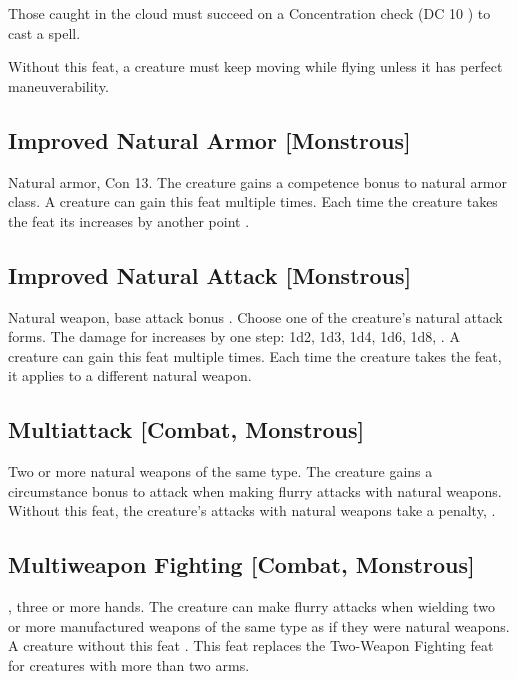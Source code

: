 Those caught in the cloud must succeed on a Concentration check (DC 10 \add {} ) to cast a spell.

 Without this feat, a creature must keep moving while flying unless it has perfect maneuverability.

\subsection{Improved Natural Armor [Monstrous]}
 Natural armor, Con 13.
 The creature gains a  competence bonus to natural armor class.
 A creature can gain this feat multiple times. Each time the creature takes the feat its  increases by another point .

\subsection{Improved Natural Attack [Monstrous]}
 Natural weapon, base attack bonus .
 Choose one of the creature's natural attack forms. The damage for  increases by one step: 1d2, 1d3, 1d4, 1d6, 1d8, .
 A creature can gain this feat multiple times. Each time the creature takes the feat, it applies to a different natural weapon.

\subsection{Multiattack [Combat, Monstrous]}
 Two or more natural weapons of the same type.
 The creature gains a  circumstance bonus to attack when making flurry attacks with natural weapons.
 Without this feat, the creature's  attacks with natural weapons take a  penalty, .

\subsection{Multiweapon Fighting [Combat, Monstrous]}
 , three or more hands.
 The creature can make flurry attacks when wielding two or more manufactured weapons of the same type as if they were natural weapons.
 A creature without this feat .
 This feat replaces the Two-Weapon Fighting feat for creatures with more than two arms.


